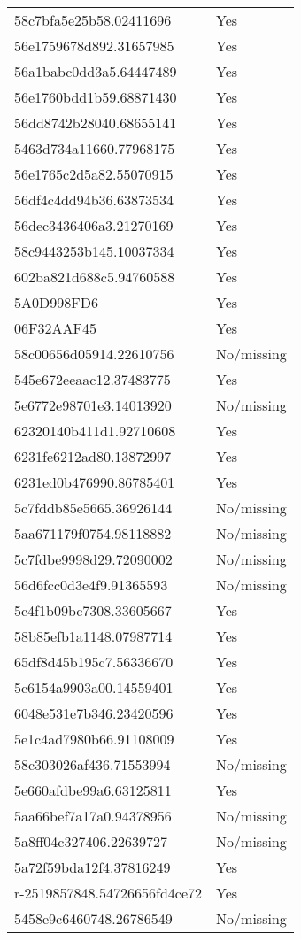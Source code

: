 \begin{tabular}{ll}
58c7bfa5e25b58.02411696 & Yes \\
56e1759678d892.31657985 & Yes \\
56a1babc0dd3a5.64447489 & Yes \\
56e1760bdd1b59.68871430 & Yes \\
56dd8742b28040.68655141 & Yes \\
5463d734a11660.77968175 & Yes \\
56e1765c2d5a82.55070915 & Yes \\
56df4c4dd94b36.63873534 & Yes \\
56dec3436406a3.21270169 & Yes \\
58c9443253b145.10037334 & Yes \\
602ba821d688c5.94760588 & Yes \\
5A0D998FD6 & Yes \\
06F32AAF45 & Yes \\
58c00656d05914.22610756 & No/missing \\
545e672eeaac12.37483775 & Yes \\
5e6772e98701e3.14013920 & No/missing \\
62320140b411d1.92710608 & Yes \\
6231fe6212ad80.13872997 & Yes \\
6231ed0b476990.86785401 & Yes \\
5c7fddb85e5665.36926144 & No/missing \\
5aa671179f0754.98118882 & No/missing \\
5c7fdbe9998d29.72090002 & No/missing \\
56d6fcc0d3e4f9.91365593 & No/missing \\
5c4f1b09bc7308.33605667 & Yes \\
58b85efb1a1148.07987714 & Yes \\
65df8d45b195c7.56336670 & Yes \\
5c6154a9903a00.14559401 & Yes \\
6048e531e7b346.23420596 & Yes \\
5e1c4ad7980b66.91108009 & Yes \\
58c303026af436.71553994 & No/missing \\
5e660afdbe99a6.63125811 & Yes \\
5aa66bef7a17a0.94378956 & No/missing \\
5a8ff04c327406.22639727 & No/missing \\
5a72f59bda12f4.37816249 & Yes \\
r-2519857848.54726656fd4ce72 & Yes \\
5458e9c6460748.26786549 & No/missing \\

\end{tabular}
